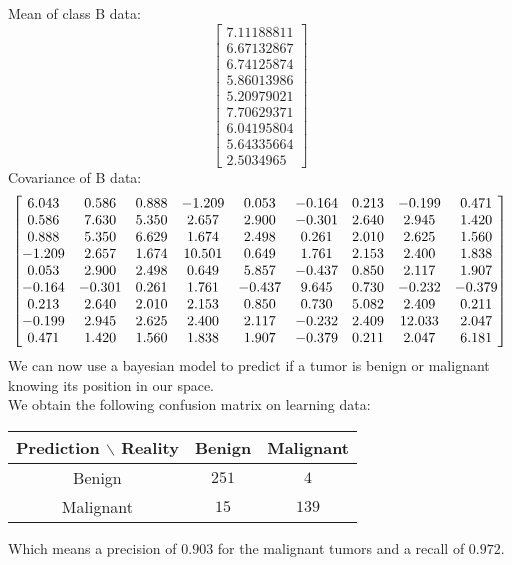 \documentclass[a4paper, 10pt]{article}
\newcommand\scalemath[2]{\scalebox{#1}{\mbox{\ensuremath{\displaystyle #2}}}}
\begin{document}
Mean of class B data:
$$
\begin{bmatrix}
    7.11188811\\
    6.67132867\\
    6.74125874\\
    5.86013986\\
    5.20979021\\
    7.70629371\\
    6.04195804\\
    5.64335664\\
    2.5034965
\end{bmatrix}
$$
Covariance of B data:
$$
\scalemath{1}{
    \begin{bmatrix}
    6.043 & 0.586 & 0.888 & -1.209 & 0.053 & -0.164 & 0.213 & -0.199 & 0.471\\
    0.586 & 7.630 & 5.350 & 2.657 & 2.900 & -0.301 & 2.640 & 2.945 & 1.420\\
    0.888 & 5.350 & 6.629 & 1.674 & 2.498 & 0.261 & 2.010 & 2.625 & 1.560\\
    -1.209 & 2.657 & 1.674 & 10.501 & 0.649 & 1.761 & 2.153 & 2.400 & 1.838\\
    0.053 & 2.900 & 2.498 & 0.649 & 5.857 & -0.437 & 0.850 & 2.117 & 1.907\\
    -0.164 & -0.301 & 0.261 & 1.761 & -0.437 & 9.645 & 0.730 & -0.232 & -0.379\\
    0.213 & 2.640 & 2.010 & 2.153 & 0.850 & 0.730 & 5.082 & 2.409 & 0.211\\
    -0.199 & 2.945 & 2.625 & 2.400 & 2.117 & -0.232 & 2.409 & 12.033 & 2.047\\
    0.471 & 1.420 & 1.560 & 1.838 & 1.907 & -0.379 & 0.211 & 2.047 & 6.181
\end{bmatrix}
}
$$
We can now use a bayesian model to predict if a tumor is benign or malignant knowing its position in our space.
\\
We obtain the following confusion matrix on learning data:
\begin{center}
    \begin{tabular}{ |c|c|c| }
        \hline
        Prediction $\backslash$ Reality & Benign & Malignant \\
        \hline
        Benign & $251$ & $4$ \\
        \hline
        Malignant & $15$ & $139$ \\ 
        \hline
    \end{tabular}
\end{center}
Which means a precision of $0.903$ for the malignant tumors and a recall of $0.972$.
\end{document}
